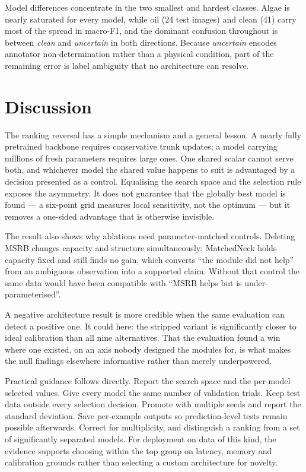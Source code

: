 \documentclass[10pt,journal]{IEEEtran}
\begin{document}
Model differences concentrate in the two smallest and hardest classes. Algae is nearly
saturated for every model, while oil (24 test images) and clean (41) carry most of the spread
in macro-F1, and the dominant confusion throughout is between \emph{clean} and
\emph{uncertain} in both directions. Because \emph{uncertain} encodes annotator
non-determination rather than a physical condition, part of the remaining error is label
ambiguity that no architecture can resolve.

\section{Discussion}
The ranking reversal has a simple mechanism and a general lesson. A nearly fully pretrained
backbone requires conservative trunk updates; a model carrying millions of fresh parameters
requires large ones. One shared scalar cannot serve both, and whichever model the shared
value happens to suit is advantaged by a decision presented as a control. Equalising the
search space and the selection rule exposes the asymmetry. It does not guarantee that the
globally best model is found --- a six-point grid measures local sensitivity, not the
optimum --- but it removes a one-sided advantage that is otherwise invisible.

The result also shows why ablations need parameter-matched controls. Deleting MSRB changes
capacity and structure simultaneously; MatchedNeck holds capacity fixed and still finds no
gain, which converts ``the module did not help'' from an ambiguous observation into a
supported claim. Without that control the same data would have been compatible with ``MSRB
helps but is under-parameterised''.

A negative architecture result is more credible when the same evaluation can detect a
positive one. It could here: the stripped variant is significantly closer to ideal
calibration than all nine alternatives. That the evaluation found a win where one existed,
on an axis nobody designed the modules for, is what makes the null findings elsewhere
informative rather than merely underpowered.

Practical guidance follows directly. Report the search space and the per-model selected
values. Give every model the same number of validation trials. Keep test data outside every
selection decision. Promote with multiple seeds and report the standard deviation. Save
per-example outputs so prediction-level tests remain possible afterwards. Correct for
multiplicity, and distinguish a ranking from a set of significantly separated models. For
deployment on data of this kind, the evidence supports choosing within the top group on
latency, memory and calibration grounds rather than selecting a custom architecture for
novelty.
\end{document}
